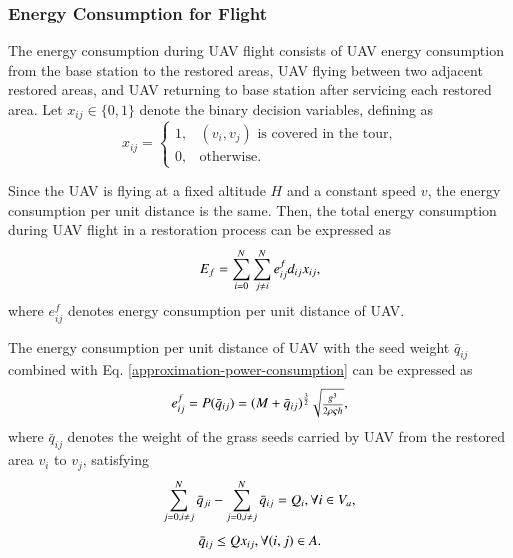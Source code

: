 \documentclass[preprint,5pt]{elsarticle}
\begin{document}
\subsubsection{Energy Consumption for Flight}
The energy consumption during UAV flight consists of UAV energy consumption from the base station to the restored areas, UAV flying between two adjacent restored areas, and UAV returning to base station after servicing each restored area.
Let $x_{ij}\in \{0,1\}$ denote the binary decision variables, defining as
\begin{equation}
    x_{ij} =
   \begin{cases}
   1, &\mbox{$(v_i,v_j)$ is covered in the tour,} \\
   0, &\mbox{otherwise}.
   \end{cases}
\end{equation}

Since the UAV is flying at a fixed altitude $H$ and a constant speed $v$, the energy consumption per unit distance is the same.
Then, the total energy consumption during UAV flight in a restoration process can be expressed as
\begin{equation} \label{flight-energy}
\begin{scriptsize}
E_f =  \sum^N_{i=0}\sum^N_{j \neq i} e^f_{ij} d_{ij} x_{ij},
\end{scriptsize}
\end{equation}
where $e^f_{ij}$ denotes energy consumption per unit distance of UAV.

The energy consumption per unit distance of UAV with the seed weight $\bar{q}_{ij}$ combined with Eq. \eqref{approximation-power-consumption} can be expressed as
\begin{equation} \label{energy-consumption-per-unit-distance}
\begin{scriptsize}
e^f_{ij} = P(\bar{q}_{ij}) = (M + \bar{q}_{ij})^{\frac{3}{2}}\sqrt{\frac{g^3}{2 \rho \varsigma h}},
\end{scriptsize}
\end{equation}
where $\bar{q}_{ij}$ denotes the weight of the grass seeds carried by UAV from the restored area $v_i$ to $v_j$, satisfying
\begin{equation} \label{remained-weight}
\begin{scriptsize}
\sum^N_{j=0, i\neq j}\bar{q}_{ji} -  \sum^N_{j=0, i\neq j}\bar{q}_{ij} = Q_i, \forall i \in V_a,
\end{scriptsize}
\end{equation}
\begin{equation} \label{demanded-weight}
\begin{small}
\bar{q}_{ij} \leq Q x_{ij}, \forall (i,j) \in A.
\end{small}
\end{equation}
\end{document}
